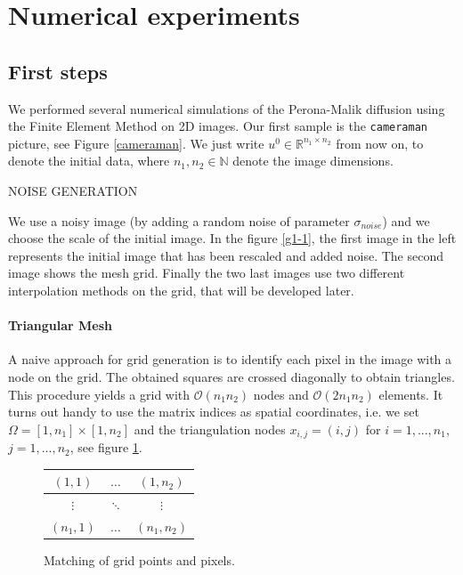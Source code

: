 \documentclass{report}
\renewcommand\O{\mathcal{O}}
\def\N{\mathbb{N}}
\def\R{\mathbb{R}}
\begin{document}
\section{Numerical experiments}

\subsection{First steps} 

We performed several numerical simulations of the Perona-Malik diffusion using the Finite Element Method on 2D images. Our first sample is the \texttt{cameraman} picture, see Figure \ref{cameraman}. We just write $u^0 \in \R^{n_1 \times n_2}$ from now on, to denote the initial data, where $n_1, n_2 \in \N$ denote the image dimensions.

NOISE GENERATION

We use a noisy image (by adding a random noise of parameter ${\sigma}_{noise}$) and we choose the scale of the initial image. In the figure \ref{g1-1}, the first image in the left represents the initial image that has been rescaled and added noise. The second image shows the mesh grid. Finally the two last images use two different interpolation methods on the grid, that will be developed later. \\

\paragraph{Triangular Mesh}

A naive approach for grid generation is to identify each pixel in the image with a node on the grid. The obtained squares are crossed diagonally to obtain triangles. This procedure yields a grid with $\O(n_1 n_2)$ nodes and $\O(2 n_1 n_2)$ elements. It turns out handy to use the matrix indices as spatial coordinates, i.e. we set $\Omega = [1,n_1] \times [1,n_2]$ and the triangulation nodes $x_{i,j} = (i,j)$ for $i=1,...,n_1$, $j=1,...,n_2$, see figure \ref{gridptpix}.
\begin{figure}[h]
	\centering
	\begin{tabular}{|c|c|c|}
		\hline		
		$(1,1)$ & $\hdots$ & $(1,n_2)$ \\ \hline
		$\vdots$ & $\ddots$ & $\vdots$ \\ \hline
		$(n_1,1)$ & $\hdots$ & $(n_1,n_2)$ \\ \hline
	\end{tabular}
	\caption{Matching of grid points and pixels.}
	\label{gridptpix}
\end{figure}
\end{document}
